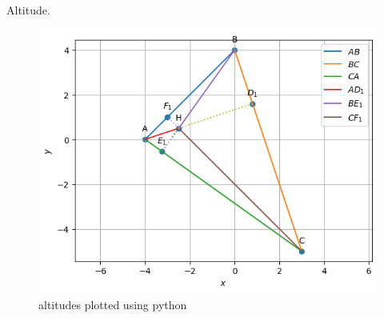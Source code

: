 \begin{table}[H]
        \centering
        
        \caption{Altitude.}
        \label{tab:Altitude}
    \end{table}
\begin{figure}[H]
\includegraphics[width=\columnwidth]{altitude/figs/altitude.png}
\caption{altitudes plotted using python}
\label{fig:i_altitude_py}
\end{figure}

